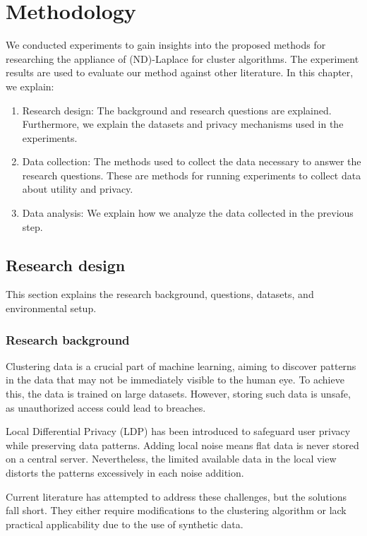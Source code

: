 \chapter{Methodology}

We conducted experiments to gain insights into the proposed methods for researching the appliance of (ND)-Laplace for cluster algorithms.
The experiment results are used to evaluate our method against other literature.
In this chapter, we explain:
\begin{enumerate}

  \item Research design: The background and research questions are explained.
        Furthermore, we explain the datasets and privacy mechanisms used in the experiments.
  \item Data collection: The methods used to collect the data necessary to answer the research questions.
        These are methods for running experiments to collect data about utility and privacy.
  \item Data analysis: We explain how we analyze the data collected in the previous step.
\end{enumerate}

\section{Research design}
This section explains the research background, questions, datasets, and environmental setup.
\subsection{Research background}
Clustering data is a crucial part of machine learning, aiming to discover patterns in the data that may not be immediately visible to the human eye.
To achieve this, the data is trained on large datasets.
However, storing such data is unsafe, as unauthorized access could lead to breaches.

Local Differential Privacy (LDP) has been introduced to safeguard user privacy while preserving data patterns.
Adding local noise means flat data is never stored on a central server.
Nevertheless, the limited available data in the local view distorts the patterns excessively in each noise addition.

Current literature has attempted to address these challenges, but the solutions fall short.
They either require modifications to the clustering algorithm or lack practical applicability due to the use of synthetic data.

